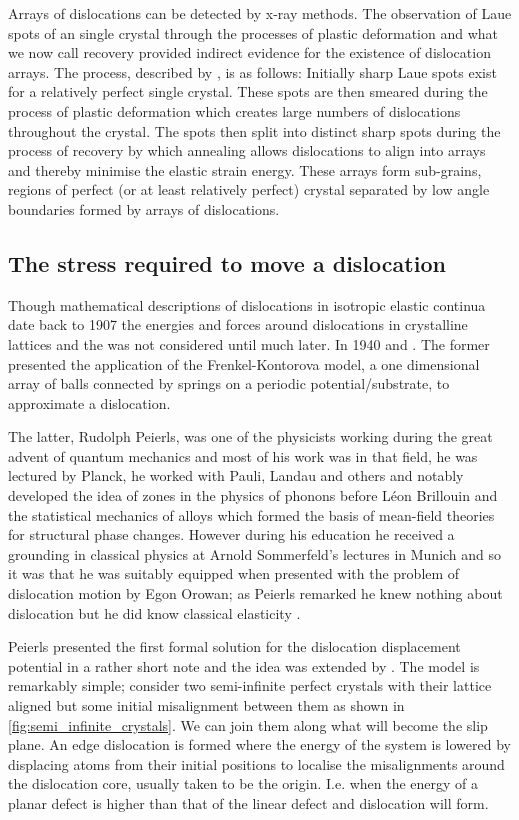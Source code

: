 Arrays of dislocations can be detected by x-ray methods. The observation of Laue spots of an single crystal through the processes of plastic deformation and what we now call recovery provided indirect evidence for the existence of dislocation arrays. The process, described by \citet{Cottrell1949}, is as follows: Initially sharp Laue spots exist for a relatively perfect single crystal. These spots are then smeared during the process of plastic deformation which creates large numbers of dislocations throughout the crystal. The spots then split into distinct sharp spots during the process of recovery by which annealing allows dislocations to align into arrays and thereby minimise the elastic strain energy. These arrays form sub-grains, regions of perfect (or at least relatively perfect) crystal separated by low angle boundaries formed by arrays of dislocations.


\subsection{The stress required to move a dislocation}

Though mathematical descriptions of dislocations in isotropic elastic continua date back to 1907 \cite{Volterra1907} the energies and forces around dislocations in crystalline lattices and the  was not considered until much later. In 1940 \citet{Dehlinger1940} and \citet{Peierls1940}. The former presented the application of the Frenkel-Kontorova model, a one dimensional array of balls connected by springs on a periodic potential/substrate, to approximate a dislocation.

The latter, Rudolph Peierls, was one of the physicists working during the great advent of quantum mechanics and most of his work was in that field, he was lectured by Planck, he worked with Pauli, Landau and others and
notably developed the idea of zones in the physics of phonons before Léon Brillouin and the statistical mechanics of alloys which formed the basis of mean-field theories for structural phase changes.
However during his education he received a grounding in classical physics at Arnold Sommerfeld's lectures in Munich and so it was that he was suitably equipped when presented with the problem of dislocation motion by Egon Orowan; as Peierls remarked he knew nothing about dislocation but he did know classical elasticity \cite{Edwards1996}.


Peierls presented the first formal solution for the dislocation displacement potential in a rather short note \cite{Peierls1940} and the idea was extended by \citet{Nabarro1947}. The model is remarkably simple; consider two semi-infinite perfect crystals with their lattice aligned but some initial misalignment between them as shown in \autoref{fig:semi_infinite_crystals}. We can join them along what will become the slip plane. An edge dislocation is formed where the energy of the system is lowered by displacing atoms from their initial positions to localise the misalignments around the dislocation core, usually taken to be the origin. I.e. when the energy of a planar defect is higher than that of the linear defect and dislocation will form.


